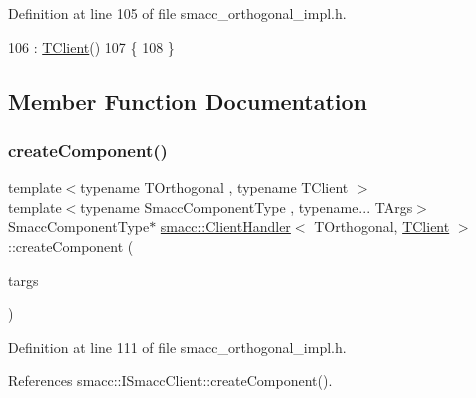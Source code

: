 Definition at line 105 of file smacc\+\_\+orthogonal\+\_\+impl.\+h.


\begin{DoxyCode}
106         : \hyperlink{classTClient}{TClient}()
107     \{
108     \}
\end{DoxyCode}


\subsection{Member Function Documentation}
\mbox{\label{classsmacc_1_1ClientHandler_a4a9adad4c37104586c9b595d9030bb3c}} 
\subsubsection{\texorpdfstring{create\+Component()}{createComponent()}}
{\footnotesize\ttfamily template$<$typename T\+Orthogonal , typename T\+Client $>$ \\
template$<$typename Smacc\+Component\+Type , typename... T\+Args$>$ \\
Smacc\+Component\+Type$\ast$ \hyperlink{classsmacc_1_1ClientHandler}{smacc\+::\+Client\+Handler}$<$ T\+Orthogonal, \hyperlink{classTClient}{T\+Client} $>$\+::create\+Component (\begin{DoxyParamCaption}\item[{T\+Args...}]{targs }\end{DoxyParamCaption})\hspace{0.3cm}{\ttfamily [inline]}}



Definition at line 111 of file smacc\+\_\+orthogonal\+\_\+impl.\+h.



References smacc\+::\+I\+Smacc\+Client\+::create\+Component().


